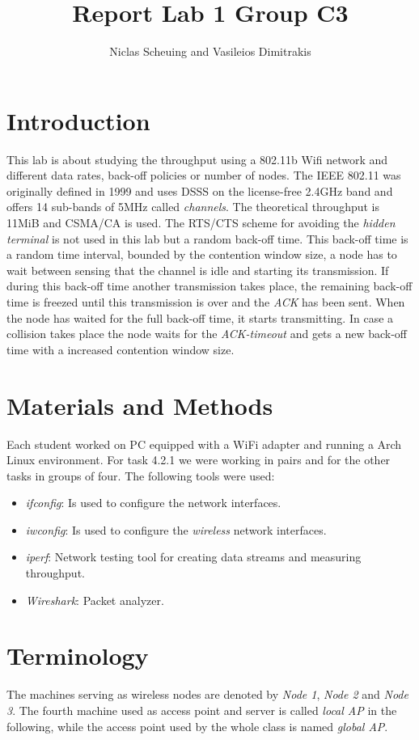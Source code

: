 \documentclass[12pt,a4paper]{article}
\title{Report Lab 1 Group C3}
\author{Niclas Scheuing and Vasileios Dimitrakis}
\begin{document}
\maketitle
\section{Introduction}
This lab is about studying the throughput using a 802.11b Wifi network and different data rates, back-off policies or number of nodes.
The IEEE 802.11\cite{802b:wiki} was originally defined in 1999 and uses DSSS on the license-free 2.4GHz band and offers 14 sub-bands of 5MHz called \emph{channels}. The theoretical throughput is 11MiB and CSMA/CA is used. The RTS/CTS scheme for avoiding the \emph{hidden terminal} is not used in this lab but a random back-off time.
This back-off time is a random time interval, bounded by the contention window size, a node has to wait between sensing that the channel is idle and starting its transmission. If during this back-off time another transmission takes place, the remaining back-off time is freezed until this transmission is over and the \emph{ACK} has been sent. When the node has waited for the full back-off time, it starts transmitting. In case a collision takes place the node waits for the \emph{ACK-timeout} and gets a new back-off time with a increased contention window size.

\section{Materials and Methods}
Each student worked on PC equipped with a WiFi adapter and running a Arch Linux environment.
For task 4.2.1 we were working in pairs and for the other tasks in groups of four.
The following tools were used:
\begin{itemize}

\item \emph{ifconfig}: Is used to configure the network interfaces.
\item \emph{iwconfig}: Is used to configure the \emph{wireless} network interfaces.
\item \emph{iperf}: Network testing tool for creating data streams and measuring throughput.
\item \emph{Wireshark}: Packet analyzer.
\end{itemize}

\section{Terminology}
The machines serving as wireless nodes are denoted by \emph{Node 1}, \emph{Node 2} and \emph{Node 3}.
The fourth machine used as access point and server is called \emph{local AP} in the following, while the access point used by the whole class is named \emph{global AP}.
\end{document}
